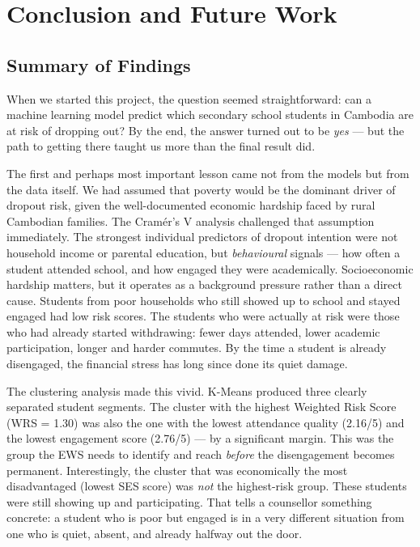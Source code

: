 \clearpage
\chapter{Conclusion and Future Work}
\label{ch:conclusion_future_work}

\section{Summary of Findings}
\label{sec:summary_findings}

When we started this project, the question seemed straightforward: can a machine learning model predict which secondary school students in Cambodia are at risk of dropping out? By the end, the answer turned out to be \textit{yes} --- but the path to getting there taught us more than the final result did.

The first and perhaps most important lesson came not from the models but from the data itself. We had assumed that poverty would be the dominant driver of dropout risk, given the well-documented economic hardship faced by rural Cambodian families. The Cram\'{e}r's V analysis challenged that assumption immediately. The strongest individual predictors of dropout intention were not household income or parental education, but \textit{behavioural} signals --- how often a student attended school, and how engaged they were academically. Socioeconomic hardship matters, but it operates as a background pressure rather than a direct cause. Students from poor households who still showed up to school and stayed engaged had low risk scores. The students who were actually at risk were those who had already started withdrawing: fewer days attended, lower academic participation, longer and harder commutes. By the time a student is already disengaged, the financial stress has long since done its quiet damage.

The clustering analysis made this vivid. K-Means produced three clearly separated student segments. The cluster with the highest Weighted Risk Score (WRS = 1.30) was also the one with the lowest attendance quality (2.16/5) and the lowest engagement score (2.76/5) --- by a significant margin. This was the group the EWS needs to identify and reach \textit{before} the disengagement becomes permanent. Interestingly, the cluster that was economically the most disadvantaged (lowest SES score) was \textit{not} the highest-risk group. These students were still showing up and participating. That tells a counsellor something concrete: a student who is poor but engaged is in a very different situation from one who is quiet, absent, and already halfway out the door.

